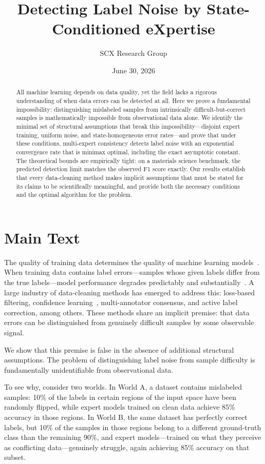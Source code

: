 \documentclass[12pt,a4paper]{article}
\title{Detecting Label Noise by State-Conditioned eXpertise}
\author{SCX Research Group}
\date{June 30, 2026}
\begin{document}
\maketitle

\begin{abstract}
All machine learning depends on data quality, yet the field lacks a rigorous understanding of when data errors can be detected at all. Here we prove a fundamental impossibility: distinguishing mislabeled samples from intrinsically difficult-but-correct samples is mathematically impossible from observational data alone. We identify the minimal set of structural assumptions that break this impossibility---disjoint expert training, uniform noise, and state-homogeneous error rates---and prove that under these conditions, multi-expert consistency detects label noise with an exponential convergence rate that is minimax optimal, including the exact asymptotic constant. The theoretical bounds are empirically tight: on a materials science benchmark, the predicted detection limit matches the observed F1 score exactly. Our results establish that every data-cleaning method makes implicit assumptions that must be stated for its claims to be scientifically meaningful, and provide both the necessary conditions and the optimal algorithm for the problem.
\end{abstract}

\section{Main Text}

The quality of training data determines the quality of machine learning models~\cite{sambasivan2021}. When training data contains label errors---samples whose given labels differ from the true labels---model performance degrades predictably and substantially~\cite{northcutt2021}. A large industry of data-cleaning methods has emerged to address this: loss-based filtering, confidence learning~\cite{northcutt2021}, multi-annotator consensus, and active label correction, among others. These methods share an implicit premise: that data errors can be distinguished from genuinely difficult samples by some observable signal.

We show that this premise is false in the absence of additional structural assumptions. The problem of distinguishing label noise from sample difficulty is fundamentally unidentifiable from observational data.

To see why, consider two worlds. In World A, a dataset contains mislabeled samples: 10\% of the labels in certain regions of the input space have been randomly flipped, while expert models trained on clean data achieve 85\% accuracy in those regions. In World B, the same dataset has perfectly correct labels, but 10\% of the samples in those regions belong to a different ground-truth class than the remaining 90\%, and expert models---trained on what they perceive as conflicting data---genuinely struggle, again achieving 85\% accuracy on that subset.
\end{document}
